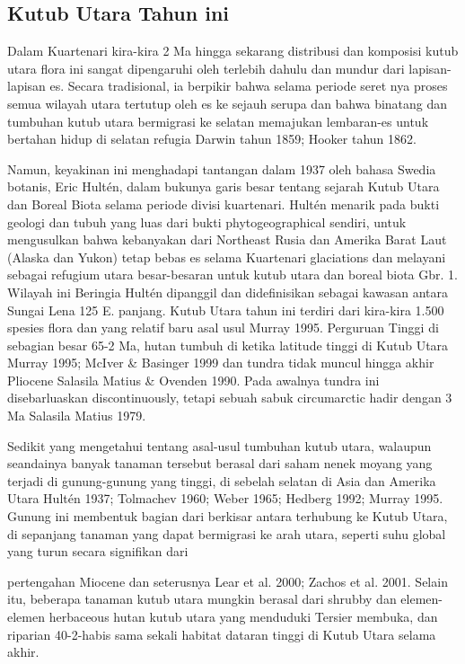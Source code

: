 \subsection{Kutub Utara Tahun ini}

		Dalam Kuartenari {kira-kira 2 Ma hingga sekarang} distribusi dan komposisi kutub utara flora ini sangat dipengaruhi oleh terlebih dahulu dan mundur dari 
	lapisan-lapisan es. Secara tradisional, ia berpikir bahwa selama periode seret nya proses semua wilayah utara tertutup oleh es ke sejauh serupa dan bahwa
	binatang dan tumbuhan kutub utara bermigrasi ke selatan memajukan lembaran-es untuk bertahan hidup di selatan refugia {Darwin tahun 1859; Hooker tahun 1862}.

	Namun, keyakinan ini menghadapi tantangan dalam 1937 oleh bahasa Swedia botanis, Eric Hultén, dalam bukunya garis besar tentang sejarah Kutub Utara dan 
	Boreal Biota selama periode divisi kuartenari. Hultén menarik pada bukti geologi dan tubuh yang luas dari bukti phytogeographical sendiri, untuk mengusulkan
	bahwa kebanyakan dari Northeast Rusia dan Amerika Barat Laut (Alaska dan Yukon) tetap bebas es selama Kuartenari glaciations dan melayani sebagai refugium 
	utara besar-besaran untuk kutub utara dan boreal biota {Gbr. 1}. Wilayah ini Beringia Hultén dipanggil dan didefinisikan sebagai kawasan antara Sungai Lena 
	{125 E. panjang.}
		Kutub Utara tahun ini terdiri dari kira-kira 1.500 spesies flora dan yang relatif baru asal usul {Murray 1995}. Perguruan Tinggi di sebagian besar {65-2 Ma}, 
	hutan tumbuh di ketika latitude tinggi di Kutub Utara {Murray 1995; McIver \& Basinger 1999} dan tundra tidak muncul hingga akhir Pliocene {Salasila Matius \& Ovenden 1990}.
	Pada awalnya tundra ini disebarluaskan discontinuously, tetapi sebuah sabuk circumarctic hadir dengan 3 Ma {Salasila Matius 1979}. 

	Sedikit yang mengetahui tentang asal-usul tumbuhan kutub utara, walaupun seandainya banyak tanaman tersebut berasal dari saham nenek moyang yang terjadi di gunung-gunung yang tinggi, di sebelah selatan di Asia dan Amerika Utara {Hultén 1937; Tolmachev 1960; Weber 1965; Hedberg 1992; Murray 1995}. Gunung ini membentuk 
	bagian dari berkisar antara terhubung ke Kutub Utara, di sepanjang tanaman yang dapat bermigrasi ke arah utara, seperti suhu global yang turun secara signifikan dari 

	pertengahan Miocene dan seterusnya {Lear et al. 2000; Zachos et al. 2001}. Selain itu, beberapa tanaman kutub utara mungkin berasal dari shrubby dan elemen-elemen 
	herbaceous hutan kutub utara yang menduduki Tersier membuka, dan riparian {40-2}-habis sama sekali habitat dataran tinggi di Kutub Utara selama akhir.
	

